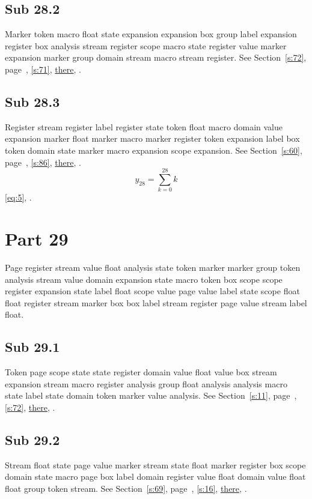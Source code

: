 \documentclass[11pt]{article}
\begin{document}
\subsection{Sub 28.2}\label{ss:28.2} Marker token macro float state expansion expansion box group label expansion register box analysis stream register scope macro state register value marker expansion marker group domain stream macro stream register. See Section~\ref{s:72}, page~\pageref{ss:18.3}, \cref{s:71}, \hyperref[s:85]{there}, \cite{k34,k36}.
\subsection{Sub 28.3}\label{ss:28.3} Register stream register label register state token float macro domain value expansion marker float marker macro marker register token expansion label box token domain state marker macro expansion scope expansion. See Section~\ref{s:60}, page~\pageref{ss:44.1}, \cref{s:86}, \hyperref[s:44]{there}, \cite{k60,k92}.
\begin{equation}y_{28}=\sum_{k=0}^{28}k\label{eq:28}\end{equation} \eqref{eq:5}, .
\section{Part 29}\label{s:29}
Page register stream value float analysis state token marker marker group token analysis stream value domain expansion state macro token box scope scope register expansion state label float scope value page value label state scope float float register stream marker box box label stream register page value stream label float.
\subsection{Sub 29.1}\label{ss:29.1} Token page scope state state register domain value float value box stream expansion stream macro register analysis group float analysis analysis macro state label state domain token marker value analysis. See Section~\ref{s:11}, page~\pageref{ss:68.1}, \cref{s:72}, \hyperref[s:51]{there}, \cite{k12,k108}.
\subsection{Sub 29.2}\label{ss:29.2} Stream float state page value marker stream state float marker register box scope domain state macro page box label domain register value float domain value float float group token stream. See Section~\ref{s:69}, page~\pageref{ss:13.1}, \cref{s:16}, \hyperref[s:77]{there}, \cite{k90,k4}.
\end{document}
